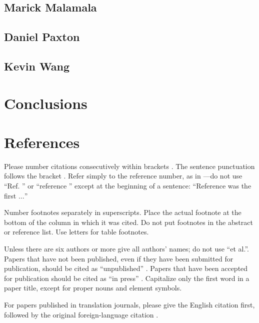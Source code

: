 \documentclass[conference]{IEEEtran}
\begin{document}
\subsection{Marick Malamala}

\subsection{Daniel Paxton}

\subsection{Kevin Wang}


\section{Conclusions}


\section*{References}

Please number citations consecutively within brackets \cite{b1}. The 
sentence punctuation follows the bracket \cite{b2}. Refer simply to the reference 
number, as in \cite{b3}---do not use ``Ref. \cite{b3}'' or ``reference \cite{b3}'' except at 
the beginning of a sentence: ``Reference \cite{b3} was the first $\ldots$''

Number footnotes separately in superscripts. Place the actual footnote at 
the bottom of the column in which it was cited. Do not put footnotes in the 
abstract or reference list. Use letters for table footnotes.

Unless there are six authors or more give all authors' names; do not use 
``et al.''. Papers that have not been published, even if they have been 
submitted for publication, should be cited as ``unpublished'' \cite{b4}. Papers 
that have been accepted for publication should be cited as ``in press'' \cite{b5}. 
Capitalize only the first word in a paper title, except for proper nouns and 
element symbols.

For papers published in translation journals, please give the English 
citation first, followed by the original foreign-language citation \cite{b6}.
\end{document}
